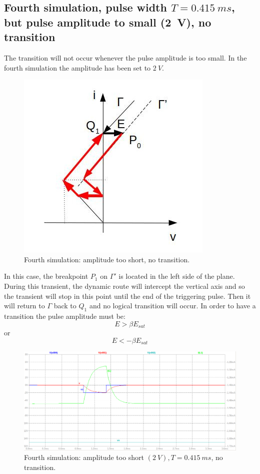 \documentclass[12pt,a4paper,tweside,onehalfspacing]{article}
\begin{document}
\subsection{Fourth simulation, pulse width \texorpdfstring{$T=0.415\ ms$}{}, but pulse amplitude to small (2\ V), no transition}
The transition will not occur whenever the pulse amplitude is too small. In the fourth simulation the amplitude has been set to $2\ V$.
%
\begin{figure}[!ht]
        \centering \includegraphics[width=0.6\columnwidth]{driving-point-characteristic-low-amplitude-shifted.jpg}
        \caption{\label{fourth-simulation-driving-point}Fourth simulation: amplitude too short, no transition.
        }
\end{figure}

\noindent In this case, the breakpoint $P_1$ on $\Gamma'$ is located in the left side of the plane. During this transient, the dynamic route will intercept the vertical axis and so the transient will stop in this point until the end of the triggering pulse. Then it will return to $\Gamma$ back to $Q_1$ and no logical transition will occur. In order to have a transition the pulse amplitude must be:
\begin{equation}
    E > \beta E_{sat}
\end{equation}
or
\begin{equation}
    E < -\beta E_{sat}
\end{equation}
\begin{figure}[!ht]
        \centering \includegraphics[width=0.8\columnwidth]{amplitude-short-no-transition.png}
        \caption{\label{fourth-simulation-amplitude-short}Fourth simulation: amplitude too short $(2\ V), T=0.415\ ms$, no transition.
        }
\end{figure}
%
%
\end{document}
